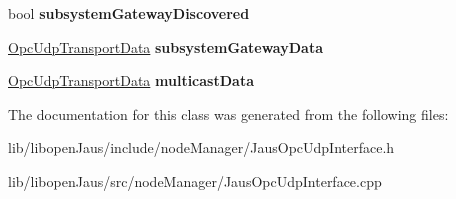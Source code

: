 \begin{DoxyCompactItemize}
\item 
\hypertarget{class_jaus_opc_udp_interface_aa61184ec907421e6bb4f2abec17989cd}{bool {\bfseries subsystem\-Gateway\-Discovered}}\label{class_jaus_opc_udp_interface_aa61184ec907421e6bb4f2abec17989cd}

\item 
\hypertarget{class_jaus_opc_udp_interface_a3cac839adee9e8ece1af1f0e2366e0a0}{\hyperlink{struct_opc_udp_transport_data}{\-Opc\-Udp\-Transport\-Data} {\bfseries subsystem\-Gateway\-Data}}\label{class_jaus_opc_udp_interface_a3cac839adee9e8ece1af1f0e2366e0a0}

\item 
\hypertarget{class_jaus_opc_udp_interface_ae305caf51e8693027fd729630b72ac11}{\hyperlink{struct_opc_udp_transport_data}{\-Opc\-Udp\-Transport\-Data} {\bfseries multicast\-Data}}\label{class_jaus_opc_udp_interface_ae305caf51e8693027fd729630b72ac11}

\end{DoxyCompactItemize}


\-The documentation for this class was generated from the following files\-:\begin{DoxyCompactItemize}
\item 
lib/libopen\-Jaus/include/node\-Manager/\-Jaus\-Opc\-Udp\-Interface.\-h\item 
lib/libopen\-Jaus/src/node\-Manager/\-Jaus\-Opc\-Udp\-Interface.\-cpp\end{DoxyCompactItemize}

